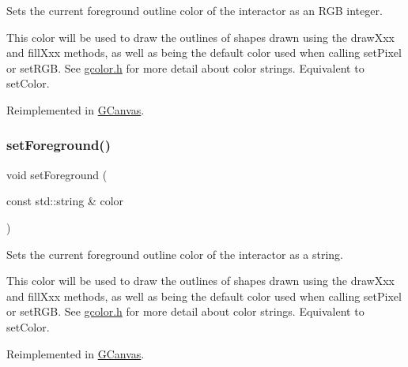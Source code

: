 Sets the current foreground outline color of the interactor as an R\+GB integer. 

This color will be used to draw the outlines of shapes drawn using the draw\+Xxx and fill\+Xxx methods, as well as being the default color used when calling set\+Pixel or set\+R\+GB. See \mbox{\hyperlink{gcolor_8h_source}{gcolor.\+h}} for more detail about color strings. Equivalent to set\+Color. 

Reimplemented in \mbox{\hyperlink{classsgl_1_1GCanvas_a59f7cd2bd1708c12dfa52a8f7c7b79c9}{G\+Canvas}}.

\mbox{\label{classsgl_1_1GDrawingSurface_af59209aeadea6dfc6d97a2d8531f50e1}} 
\subsubsection{\texorpdfstring{set\+Foreground()}{setForeground()}\hspace{0.1cm}{\footnotesize\ttfamily [2/2]}}
{\footnotesize\ttfamily void set\+Foreground (\begin{DoxyParamCaption}\item[{const std\+::string \&}]{color }\end{DoxyParamCaption})\hspace{0.3cm}{\ttfamily [virtual]}}



Sets the current foreground outline color of the interactor as a string. 

This color will be used to draw the outlines of shapes drawn using the draw\+Xxx and fill\+Xxx methods, as well as being the default color used when calling set\+Pixel or set\+R\+GB. See \mbox{\hyperlink{gcolor_8h_source}{gcolor.\+h}} for more detail about color strings. Equivalent to set\+Color. 

Reimplemented in \mbox{\hyperlink{classsgl_1_1GCanvas_a8afbcf1f47750fb4c717f9ff36540235}{G\+Canvas}}.

\mbox{\label{classsgl_1_1GDrawingSurface_a6bfe14a77101db0fb97b5a7e07a5526b}} 
